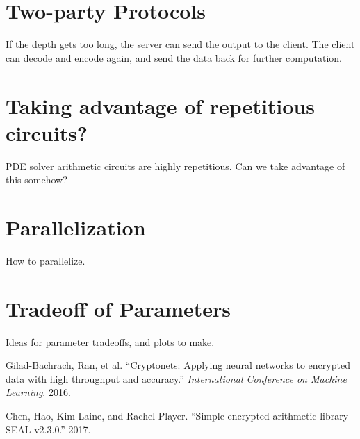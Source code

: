 \documentclass[12pt]{article}
\begin{document}
\section*{Two-party Protocols}

If the depth gets too long, the server can send the output to the client.  The client can decode and encode again, and send the data back for further computation.

\section*{Taking advantage of repetitious circuits?}

PDE solver arithmetic circuits are highly repetitious.  Can we take advantage of this somehow?

\section*{Parallelization}

How to parallelize.

\section*{Tradeoff of Parameters}

Ideas for parameter tradeoffs, and plots to make.



\begin{thebibliography}{99}

Gilad-Bachrach, Ran, et al. ``Cryptonets: Applying neural networks to encrypted data with high throughput and accuracy.'' \textit{International Conference on Machine Learning}. 2016.

Chen, Hao, Kim Laine, and Rachel Player. ``Simple encrypted arithmetic library-SEAL v2.3.0.'' 2017.

\end{thebibliography}
\end{document}
